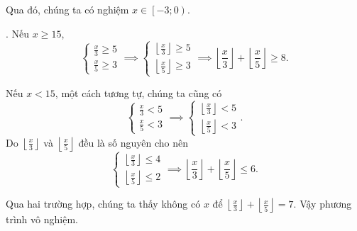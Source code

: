 Qua đó, chúng ta có nghiệm $x \in \left[-3; 0\right)$.

. Nếu $x \geq 15$, $$\begin{cases}
   \frac{x}{3} \geq 5 \\
   \frac{x}{5} \geq 3
\end{cases} \implies \begin{cases}
   \left\lfloor \frac{x}{3} \right\rfloor \geq 5 \\
   \left\lfloor \frac{x}{5} \right\rfloor \geq 3
\end{cases} \implies \left\lfloor \frac{x}{3} \right\rfloor + \left\lfloor \frac{x}{5} \right\rfloor \geq 8.$$

Nếu $x < 15$, một cách tương tự, chúng ta cũng có
\begin{equation*}
   \begin{cases}
      \frac{x}{3} < 5 \\
      \frac{x}{5} < 3
   \end{cases} \implies \begin{cases}
      \left\lfloor \frac{x}{3} \right\rfloor < 5 \\
      \left\lfloor \frac{x}{5} \right\rfloor < 3
   \end{cases}.
\end{equation*}
Do $\left\lfloor \frac{x}{3} \right\rfloor$ và $\left\lfloor \frac{x}{5} \right\rfloor$ đều là số nguyên cho nên
$$
\begin{cases}
   \left\lfloor \frac{x}{3} \right\rfloor \leq 4 \\
   \left\lfloor \frac{x}{5} \right\rfloor \leq 2
\end{cases} \implies \left\lfloor \frac{x}{3} \right\rfloor + \left\lfloor \frac{x}{5} \right\rfloor \leq 6.
$$

Qua hai trường hợp, chúng ta thấy không có $x$ để $\left\lfloor \frac{x}{3} \right\rfloor + \left\lfloor \frac{x}{5} \right\rfloor = 7$. Vậy phương trình vô nghiệm.